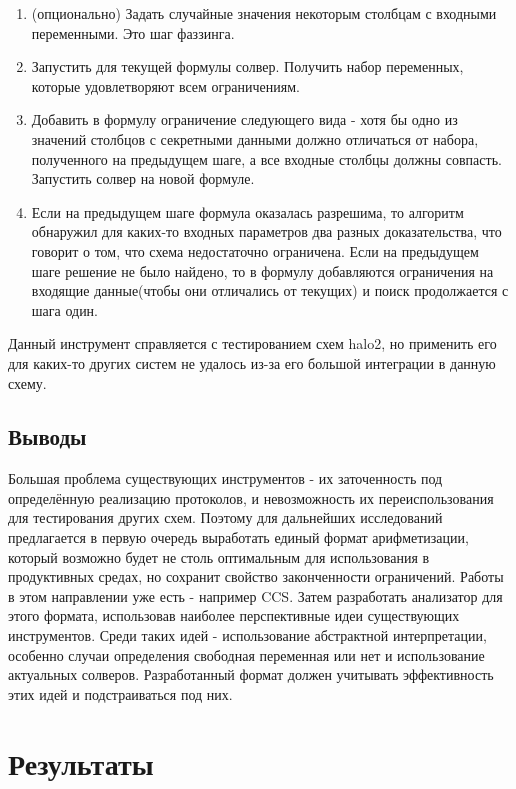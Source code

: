 \documentclass[a4paper]{article}
\begin{document}
\begin{enumerate}
    \item (опционально) Задать случайные значения некоторым столбцам с входными переменными. Это шаг фаззинга.
    \item Запустить для текущей формулы солвер. Получить набор переменных, которые удовлетворяют всем ограничениям.
    \item Добавить в формулу ограничение следующего вида - хотя бы одно из значений столбцов с секретными данными должно отличаться от набора, полученного на предыдущем шаге, а все входные столбцы должны совпасть. Запустить солвер на новой формуле.
    \item Если на предыдущем шаге формула оказалась разрешима, то алгоритм обнаружил для каких-то входных параметров два разных доказательства, что говорит о том, что схема недостаточно ограничена. Если на предыдущем шаге решение не было найдено, то в формулу добавляются ограничения на входящие данные(чтобы они отличались от текущих) и поиск продолжается с шага один.
\end{enumerate}

Данный инструмент справляется с тестированием схем halo2, но применить его для каких-то других систем не удалось из-за его большой интеграции в данную схему.

\subsection{Выводы}
\indent

Большая проблема существующих инструментов - их заточенность под определённую реализацию протоколов, и невозможность их переиспользования для тестирования других схем. Поэтому для дальнейших исследований предлагается в первую очередь выработать единый формат арифметизации, который возможно будет не столь оптимальным для использования в продуктивных средах, но сохранит свойство законченности ограничений. Работы в этом направлении уже есть - например CCS\cite{litlink18}. Затем разработать анализатор для этого формата, использовав наиболее перспективные идеи существующих инструментов. Среди таких идей - использование абстрактной интерпретации, особенно случаи определения свободная переменная или нет и использование актуальных солверов. Разработанный формат должен учитывать эффективность этих идей и подстраиваться под них.

\section{Результаты}
\indent
\end{document}
